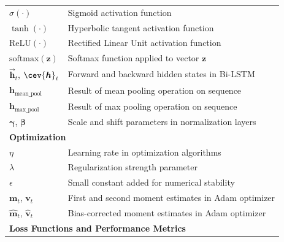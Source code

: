 \begin{appendices}
\begin{longtable}{p{}p{}}
    \midrule
    $\sigma(\cdot)$                             & Sigmoid activation function                                                          \\
    $\tanh(\cdot)$                              & Hyperbolic tangent activation function                                               \\
    $\text{ReLU}(\cdot)$                        & Rectified Linear Unit activation function                                            \\
    $\text{softmax}(\bm{z})$                    & Softmax function applied to vector $\bm{z}$                                          \\
    $\vec{\bm{h}}_t$, $\cev{\bm{h}}_t$          & Forward and backward hidden states in Bi-LSTM                                        \\
    $\bm{h}_{\text{mean\_pool}}$                & Result of mean pooling operation on sequence                                         \\
    $\bm{h}_{\text{max\_pool}}$                 & Result of max pooling operation on sequence                                          \\
    $\bm{\gamma}$, $\bm{\beta}$                 & Scale and shift parameters in normalization layers                                   \\
    \midrule
    \multicolumn{2}{l}{\textbf{Optimization}}                                                                                          \\
    \midrule
    $\eta$                                      & Learning rate in optimization algorithms                                             \\
    $\lambda$                                   & Regularization strength parameter                                                    \\
    $\epsilon$                                  & Small constant added for numerical stability                                         \\
    $\bm{m}_t$, $\bm{v}_t$                      & First and second moment estimates in Adam optimizer                                  \\
    $\hat{\bm{m}}_t$, $\hat{\bm{v}}_t$          & Bias-corrected moment estimates in Adam optimizer                                    \\
    \midrule
    \multicolumn{2}{l}{\textbf{Loss Functions and Performance Metrics}}                                                                \\

\end{longtable}
\end{appendices}
